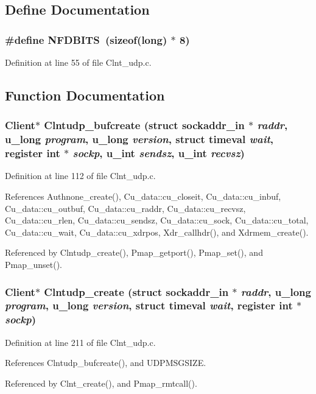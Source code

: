 \subsection{Define Documentation}
\subsubsection{\setlength{\rightskip}{0pt plus 5cm}\#define NFDBITS\ (sizeof(long) $\ast$ 8)}\label{Clnt__udp_8c_a0}




Definition at line 55 of file Clnt\_\-udp.c.

\subsection{Function Documentation}
\subsubsection{\setlength{\rightskip}{0pt plus 5cm}Client$\ast$ Clntudp\_\-bufcreate (struct sockaddr\_\-in $\ast$ {\em raddr}, u\_\-long {\em program}, u\_\-long {\em version}, struct timeval {\em wait}, register int $\ast$ {\em sockp}, u\_\-int {\em sendsz}, u\_\-int {\em recvsz})}\label{Clnt__udp_8c_a8}




Definition at line 112 of file Clnt\_\-udp.c.

References Authnone\_\-create(), Cu\_\-data::cu\_\-closeit, Cu\_\-data::cu\_\-inbuf, Cu\_\-data::cu\_\-outbuf, Cu\_\-data::cu\_\-raddr, Cu\_\-data::cu\_\-recvsz, Cu\_\-data::cu\_\-rlen, Cu\_\-data::cu\_\-sendsz, Cu\_\-data::cu\_\-sock, Cu\_\-data::cu\_\-total, Cu\_\-data::cu\_\-wait, Cu\_\-data::cu\_\-xdrpos, Xdr\_\-callhdr(), and Xdrmem\_\-create().

Referenced by Clntudp\_\-create(), Pmap\_\-getport(), Pmap\_\-set(), and Pmap\_\-unset().
\subsubsection{\setlength{\rightskip}{0pt plus 5cm}Client$\ast$ Clntudp\_\-create (struct sockaddr\_\-in $\ast$ {\em raddr}, u\_\-long {\em program}, u\_\-long {\em version}, struct timeval {\em wait}, register int $\ast$ {\em sockp})}\label{Clnt__udp_8c_a9}




Definition at line 211 of file Clnt\_\-udp.c.

References Clntudp\_\-bufcreate(), and UDPMSGSIZE.

Referenced by Clnt\_\-create(), and Pmap\_\-rmtcall().